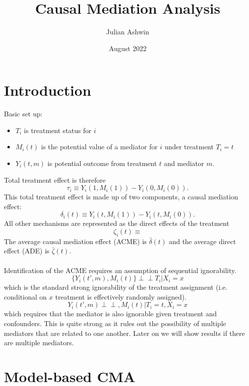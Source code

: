 \documentclass{article}
\title{Causal Mediation Analysis}
\author{Julian Ashwin}
\date{August 2022}
\newcommand{\indep}{\perp\!\!\!\!\perp}
\begin{document}
	
	\maketitle
	
	\section{Introduction}
	
	
	Basic set up:
	\begin{itemize}
		\item $T_i$ is treatment status for $i$
		\item $M_i(t)$ is the potential value of a mediator for $i$ under treatment $T_i = t$
		\item $Y_i(t,m)$ is potential outcome from treatment $t$ and mediator $m$. 
	\end{itemize}
	Total treatment effect is therefore
	$$
	\tau_i \equiv Y_i(1, M_i(1)) - Y_i(0,M_i(0)).
	$$
	This total treatment effect is made up of two components, a causal mediation effect:
	$$
	\delta_i(t) \equiv Y_i(t, M_i(1)) - Y_i(t,M_i(0)).
	$$
	All other mechanisms are represented as the direct effects of the treatment
	$$
	\zeta_i(t) \equiv
	$$
	The average causal mediation effect (ACME) is $\bar{\delta}(t)$ and the average direct effect (ADE) is $\bar{\zeta}(t)$. 
	\\~\\
	Identification of the ACME requires an assumption of sequential ignorability. 
	\begin{equation}
		\{Y_i(t',m), M_i(t)\} \indep T_i | X_i = x 
	\end{equation}
	which is the standard strong ignorability of the treatment assignment (i.e. conditional on $x$ treatment is effectively randomly assigned). 
	\begin{equation}
		Y_i(t',m) \indep , M_i(t) | T_i =t, X_i = x 
	\end{equation}
	which requires that the mediator is also ignorable given treatment and confounders. This is quite strong as it rules out the possibility of multiple mediators that are related to one another. Later on we will show results if there are multiple mediators. 
	
	
	\section{Model-based CMA}
	
\end{document}

